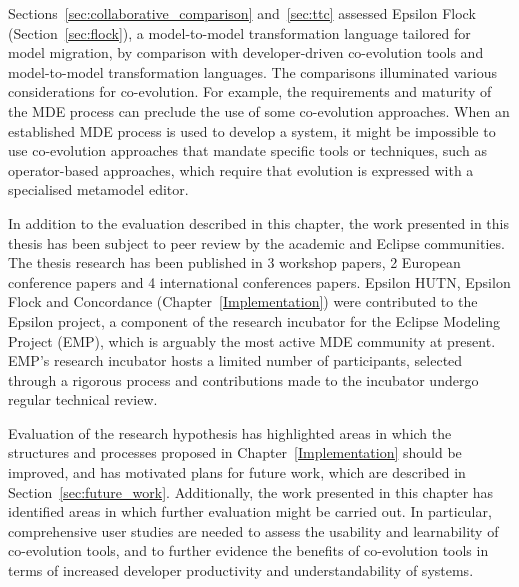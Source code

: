 Sections~\ref{sec:collaborative_comparison} and~\ref{sec:ttc} assessed Epsilon Flock (Section~\ref{sec:flock}), a model-to-model transformation language tailored for model migration, by comparison with developer-driven co-evolution tools and model-to-model transformation languages. The comparisons illuminated various considerations for co-evolution. For example, the requirements and maturity of the MDE process can preclude the use of some co-evolution approaches. When an established MDE process is used to develop a system, it might be impossible to use co-evolution approaches that mandate specific tools or techniques, such as operator-based approaches, which require that evolution is expressed with a specialised metamodel editor.

In addition to the evaluation described in this chapter, the work presented in this thesis has been subject to peer review by the academic and Eclipse communities. The thesis research has been published in 3 workshop papers, 2 European conference papers and 4 international conferences papers. Epsilon HUTN, Epsilon Flock and Concordance (Chapter~\ref{Implementation}) were contributed to the Epsilon project, a component of the research incubator for the Eclipse Modeling Project (EMP), which is arguably the most active MDE community at present. EMP's research incubator hosts a limited number of participants, selected through a rigorous process and contributions made to the incubator undergo regular technical review. 

Evaluation of the research hypothesis has highlighted areas in which the structures and processes proposed in Chapter~\ref{Implementation} should be improved, and has motivated plans for future work, which are described in Section~\ref{sec:future_work}. Additionally, the work presented in this chapter has identified areas in which further evaluation might be carried out. In particular, comprehensive user studies are needed to assess the usability and learnability of co-evolution tools, and to further evidence the benefits of co-evolution tools in terms of increased developer productivity and understandability of systems.